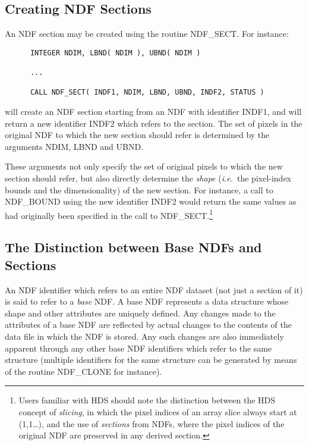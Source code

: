 \documentclass[twoside,11pt]{article}
\newcommand{\htmlref}[2]{#1}
\newcommand{\xref}[3]{#1}
\newcommand{\xlabel}[1]{}
\newcommand{\st}[1]{{\em{#1}}}
\begin{document}
\subsection{\xlabel{creating_ndf_sections}\label{ss:creatingsections}Creating NDF Sections}

An NDF section may be created using the routine \htmlref{NDF\_SECT}{NDF_SECT}.
For instance:

\small
\begin{verbatim}
      INTEGER NDIM, LBND( NDIM ), UBND( NDIM )

      ...

      CALL NDF_SECT( INDF1, NDIM, LBND, UBND, INDF2, STATUS )
\end{verbatim}
\normalsize

will create an NDF section starting from an NDF with identifier INDF1, and
will return a new identifier INDF2 which refers to the section. 
The set of pixels in the original NDF to which the new section should refer
is determined by the arguments NDIM, LBND and UBND.

These arguments not only specify the set of original pixels to which
the new section should refer, but also directly determine the
\st{shape\/} (\st{i.e.}\ the pixel-index bounds and the
dimensionality) 
of the new section.
For instance, a call to \htmlref{NDF\_BOUND}{NDF_BOUND} using the new identifier INDF2 would 
return the same values as had originally been specified in the call to
NDF\_SECT.\footnote{Users familiar with \xref{HDS}{sun92}{} should
note the distinction between the HDS concept of
\xref{\st{slicing}}{sun92}{accessing_subsets}, in which the pixel
indices of an 
array slice always start at (1,1\ldots), and the use of
\st{sections\/} from NDFs, where the pixel indices of the original NDF
are 
preserved in any derived section.}

\subsection{\xlabel{the_distinction_between_base_ndfs_and_sections}The Distinction between Base NDFs and Sections}

An NDF identifier which refers to an entire NDF dataset (not just a section
of it) is said to refer to a \st{base\/} NDF.
A base NDF represents a data structure whose shape and other attributes are
uniquely defined. 
Any changes made to the attributes of a base NDF are reflected by actual
changes to the contents of the data file in which the NDF is stored. 
Any such changes are also immediately apparent through any other base NDF
identifiers which refer to the same structure (multiple identifiers for the
same structure can be generated by means of the routine \htmlref{NDF\_CLONE}{NDF_CLONE} for
instance). 
\end{document}
